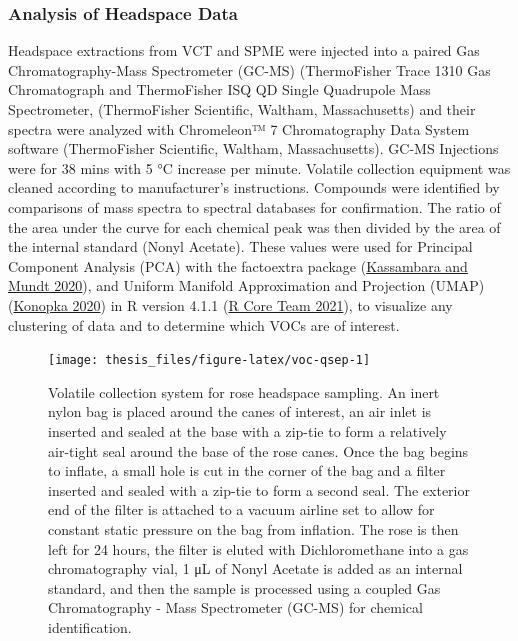 \documentclass[12pt,final,CPage]{ufthesis}
\begin{document}
{  \hypertarget{mm-voc-analyze}{%
  \subsubsection{Analysis of Headspace Data}\label{mm-voc-analyze}}

  Headspace extractions from VCT and SPME were injected into a paired Gas Chromatography-Mass Spectrometer (GC-MS) (ThermoFisher Trace 1310 Gas Chromatograph and ThermoFisher ISQ QD Single Quadrupole Mass Spectrometer, (ThermoFisher Scientific, Waltham, Massachusetts) and their spectra were analyzed with Chromeleon™ 7 Chromatography Data System software (ThermoFisher Scientific, Waltham, Massachusetts). GC-MS Injections were for 38 mins with 5 °C increase per minute. Volatile collection equipment was cleaned according to manufacturer's instructions. Compounds were identified by comparisons of mass spectra to spectral databases for confirmation. The ratio of the area under the curve for each chemical peak was then divided by the area of the internal standard (Nonyl Acetate). These values were used for Principal Component Analysis (PCA) with the factoextra package (\protect\hyperlink{ref-Kassambara2020a}{Kassambara and Mundt 2020}), and Uniform Manifold Approximation and Projection (UMAP) (\protect\hyperlink{ref-Konopka2020a}{Konopka 2020}) in R version 4.1.1 (\protect\hyperlink{ref-RCT2021}{R Core Team 2021}), to visualize any clustering of data and to determine which VOCs are of interest.
  \begin{figure}

  {\centering \texttt{[image: thesis\_files/figure-latex/voc-qsep-1]} 

  }

  \caption{Volatile collection system for rose headspace sampling. An inert nylon bag is placed around the canes of interest, an air inlet is inserted and sealed at the base with a zip-tie to form a relatively air-tight seal around the base of the rose canes. Once the bag begins to inflate, a small hole is cut in the corner of the bag and a filter inserted and sealed with a zip-tie to form a second seal. The exterior end of the filter is attached to a vacuum airline set to allow for constant static pressure on the bag from inflation. The rose is then left for 24 hours, the filter is eluted with Dichloromethane into a gas chromatography vial, 1 \si{\micro\liter} of Nonyl Acetate is added as an internal standard, and then the sample is processed using a coupled Gas Chromatography - Mass Spectrometer (GC-MS) for chemical identification.}\label{fig:voc-qsep}
  \end{figure}
  \begin{figure}


\end{figure}}
\end{document}
